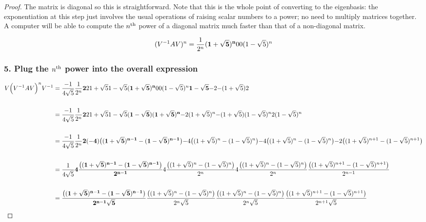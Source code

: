 \begin{proof}
The matrix is diagonal so this is straightforward. Note that this is the whole
point of converting to the eigenbasis: the exponentiation at this step just
involves the usual operations of raising scalar numbers to a power; no need to
multiply matrices together. A computer will be able to compute the $n^{\text{th}}$ power
of a diagonal matrix much faster than that of a non-diagonal matrix.

$$
(V^{-1}AV)^n = \frac{1}{2^n} \mathbf{(1 + \sqrt 5)^n}{0          }
                                 {0              }{(1 - \sqrt 5)^n}
$$

\subsubsection{5. Plug the $n^{\text{th}}$ power into the overall expression}

\begin{align*}
V \Big(V^{-1}AV\Big)^n V^{-1}
&=
\frac{-1}{4\sqrt 5}
\frac{1}{2^n}
\mathbf{2          }{2          }
    {1 + \sqrt 5}{1 - \sqrt 5}
\mathbf{(1 + \sqrt 5)^n}{0              }
    {0              }{(1 - \sqrt 5)^n}
\mathbf{1 - \sqrt 5 }{-2}
    {-(1 + \sqrt 5)}{2}
\\\\
&=
\frac{-1}{4\sqrt 5}
\frac{1}{2^n}
\mathbf{2          }{2          }
    {1 + \sqrt 5}{1 - \sqrt 5}
\mathbf{(1 - \sqrt 5)(1 + \sqrt 5)^n}{-2(1 + \sqrt 5)^n}
    {-(1 + \sqrt 5)(1 - \sqrt 5)^n}{2(1 - \sqrt 5)^n}
\\\\
&=
\frac{-1}{4\sqrt 5}
\frac{1}{2^n}
\mathbf{2(-4)\big((1 + \sqrt 5)^{n-1} - (1 - \sqrt 5)^{n-1}\big)}{-4\big((1 + \sqrt 5)^n     - (1 - \sqrt 5)^n    \big)}
    {   -4\big((1 + \sqrt 5)^n     - (1 - \sqrt 5)^n    \big)}{-2\big((1 + \sqrt 5)^{n+1} - (1 - \sqrt 5)^{n+1}\big)}
\\\\
&=
\frac{1}{4\sqrt 5}
\mathbf{4\frac{\big((1 + \sqrt 5)^{n-1} - (1 - \sqrt 5)^{n-1}\big)}{2^{n-1}}}{4\frac{\big((1 + \sqrt 5)^n     - (1 - \sqrt 5)^n    \big)}{2^n    }}
    {4\frac{\big((1 + \sqrt 5)^n     - (1 - \sqrt 5)^n    \big)}{2^n    }}{ \frac{\big((1 + \sqrt 5)^{n+1} - (1 - \sqrt 5)^{n+1}\big)}{2^{n-1}}}
\\\\
&=
\mathbf{\frac{\big((1 + \sqrt 5)^{n-1} - (1 - \sqrt 5)^{n-1}\big)}{2^{n-1}\sqrt 5}}{\frac{\big((1 + \sqrt 5)^n     - (1 - \sqrt 5)^n    \big)}{2^n    \sqrt 5}}
    {\frac{\big((1 + \sqrt 5)^n     - (1 - \sqrt 5)^n    \big)}{2^n    \sqrt 5}}{\frac{\big((1 + \sqrt 5)^{n+1} - (1 - \sqrt 5)^{n+1}\big)}{2^{n+1}\sqrt 5}}
\end{align*}


\end{proof}
